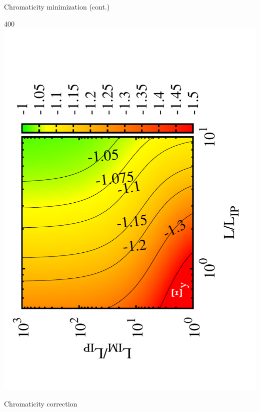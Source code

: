 \documentclass{beamer}
\begin{document}
\begin{frame}{Chromaticity minimization (cont.)}
\begin{textblock}{400}
 \includegraphics[scale=0.20,angle=-90]{Xi_ya.pdf}
\end{textblock}
\end{frame}
\begin{frame}
 \color{blue}\Large Chromaticity correction
\end{frame}
\end{document}
